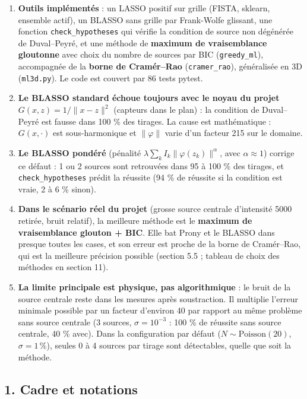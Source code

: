 \documentclass[
  french,
]{article}
\providecommand{\tightlist}{%
  \setlength{\itemsep}{0pt}\setlength{\parskip}{0pt}}
\begin{document}
\begin{enumerate}
\def\labelenumi{\arabic{enumi}.}
\tightlist
\item
  \textbf{Outils implémentés} : un LASSO positif sur grille (FISTA,
  sklearn, ensemble actif), un BLASSO sans grille par Frank-Wolfe
  glissant, une fonction \texttt{check\_hypotheses} qui vérifie la
  condition de source non dégénérée de Duval--Peyré, et une méthode de
  \textbf{maximum de vraisemblance gloutonne} avec choix du nombre de
  sources par BIC (\texttt{greedy\_ml}), accompagnée de la \textbf{borne
  de Cramér--Rao} (\texttt{cramer\_rao}), généralisée en 3D
  (\texttt{ml3d.py}). Le code est couvert par 86 tests pytest.
\item
  \textbf{Le BLASSO standard échoue toujours avec le noyau du projet}
  \(G(x,z) = 1/\lVert x-z\rVert^2\) (capteurs dans le plan) : la
  condition de Duval--Peyré est fausse dans 100 \% des tirages. La cause
  est mathématique : \(G(x,\cdot)\) est sous-harmonique et
  \(\lVert\varphi\rVert\) varie d'un facteur 215 sur le domaine.
\item
  \textbf{Le BLASSO pondéré} (pénalité
  \(\lambda\sum_k I_k\lVert\varphi(z_k)\rVert^{\alpha}\), avec
  \(\alpha\approx 1\)) corrige ce défaut : 1 ou 2 sources sont
  retrouvées dans 95 à 100 \% des tirages, et \texttt{check\_hypotheses}
  prédit la réussite (94 \% de réussite si la condition est vraie, 2 à 6
  \% sinon).
\item
  \textbf{Dans le scénario réel du projet} (grosse source centrale
  d'intensité 5000 retirée, bruit relatif), la meilleure méthode est le
  \textbf{maximum de vraisemblance glouton + BIC}. Elle bat Prony et le
  BLASSO dans presque toutes les cases, et son erreur est proche de la
  borne de Cramér--Rao, qui est la meilleure précision possible (section
  5.5 ; tableau de choix des méthodes en section 11).
\item
  \textbf{La limite principale est physique, pas algorithmique} : le
  bruit de la source centrale reste dans les mesures après soustraction.
  Il multiplie l'erreur minimale possible par un facteur d'environ 40
  par rapport au même problème sans source centrale (3 sources,
  \(\sigma = 10^{-3}\) : 100 \% de réussite sans source centrale, 40 \%
  avec). Dans la configuration par défaut
  (\(N\sim\mathrm{Poisson}(20)\), \(\sigma = 1\,\%\)), seules 0 à 4
  sources par tirage sont détectables, quelle que soit la méthode.
\end{enumerate}

\subsection{1. Cadre et notations}\label{cadre-et-notations}
\end{document}

